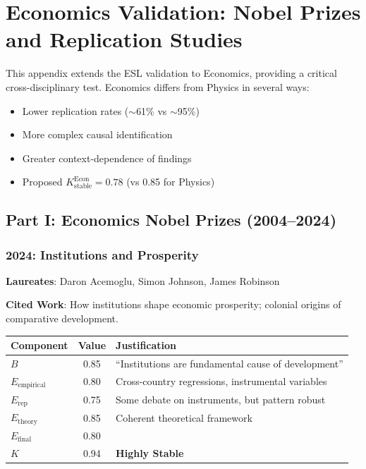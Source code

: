 \documentclass[11pt,a4paper]{article}
\begin{document}
\section{Economics Validation: Nobel Prizes and Replication Studies}
\label{app:economics-validation}

This appendix extends the ESL validation to Economics, providing a critical cross-disciplinary test. Economics differs from Physics in several ways:
\begin{itemize}
    \item Lower replication rates ($\sim$61\% vs $\sim$95\%)
    \item More complex causal identification
    \item Greater context-dependence of findings
    \item Proposed $K_{\text{stable}}^{\text{Econ}} = 0.78$ (vs 0.85 for Physics)
\end{itemize}

\subsection{Part I: Economics Nobel Prizes (2004--2024)}

\subsubsection{2024: Institutions and Prosperity}
\textbf{Laureates}: Daron Acemoglu, Simon Johnson, James Robinson

\textbf{Cited Work}: How institutions shape economic prosperity; colonial origins of comparative development.

\begin{center}
\begin{tabular}{lcl}
\toprule
\textbf{Component} & \textbf{Value} & \textbf{Justification} \\
\midrule
$B$ & 0.85 & ``Institutions are fundamental cause of development'' \\
$E_{\text{empirical}}$ & 0.80 & Cross-country regressions, instrumental variables \\
$E_{\text{rep}}$ & 0.75 & Some debate on instruments, but pattern robust \\
$E_{\text{theory}}$ & 0.85 & Coherent theoretical framework \\
\midrule
$E_{\text{final}}$ & 0.80 & \\
$K$ & 0.94 & \textbf{Highly Stable} \\
\bottomrule
\end{tabular}
\end{center}
\end{document}
